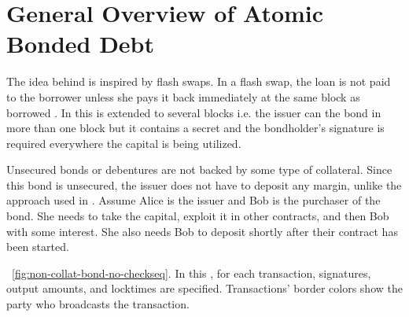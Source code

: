 \section{General Overview of Atomic Bonded Debt}
\label{sec:abd}

The idea behind  is inspired by flash swaps. In a flash swap, the loan is not paid to the borrower unless she pays it back immediately at the same block as borrowed . In \abcd this is extended to several blocks i.e. the issuer can  the bond in more than one block but it contains a secret and the bondholder's signature is required everywhere the capital is being utilized. 

Unsecured bonds or debentures are not backed by some type of collateral. Since this bond is unsecured, the issuer does not have to deposit any margin, unlike the approach used in . Assume Alice is the issuer and Bob is the purchaser of the bond. She needs to take the capital, exploit it in other contracts, and then  Bob with some interest. She also needs Bob to deposit shortly after their contract has been started.

~\ref{fig:non-collat-bond-no-checkseq}. In this , for each transaction, signatures, output amounts, and locktimes are specified. Transactions' border colors show the party who broadcasts the transaction. 

